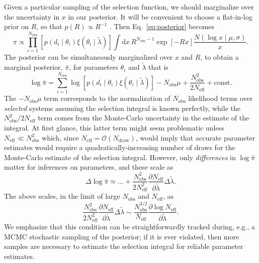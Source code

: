 \documentclass[modern]{aastex62}
\newcommand{\dd}{\mathrm{d}}
\newcommand{\Ndraw}{N_\mathrm{draw}}
\newcommand{\Neff}{N_\mathrm{eff}}
\newcommand{\Nobs}{N_\mathrm{obs}}
\begin{document}
Given a particular sampling of the selection function, we should marginalize
over the uncertainty in $x$ in our posterior.  It will be convenient to choose a
flat-in-log prior on $R$, so that $p(R) \propto R^{-1}$
\citep{Fishbach2018,Mandel2018}.  Then Eq.\ \eqref{eq:posterior} becomes
%
\begin{equation}
  \label{eq:posterior-integrated}
    \pi \propto \prod_{i = 1}^{\Nobs} \left[ p\left( d_i \mid \theta_i \right) \xi\left( \theta_i \mid \tilde{\lambda} \right) \right] \int \dd x \, R^{\Nobs - 1} \exp\left[ -R x \right] \frac{N\left( \log x \mid \mu, \sigma\right)}{x}.
\end{equation}
%
The posterior can be simultaneously marginalized over $x$ and $R$, to obtain a
marginal posterior, $\bar{\pi}$, for parameters $\theta_i$ and $\tilde{\lambda}$
that is
%
\begin{equation}
  \log \bar{\pi} = \sum_{i = 1}^{\Nobs} \log \left[ p\left( d_i \mid \theta_i \right) \xi\left( \theta_i \mid \tilde{\lambda} \right) \right] - \Nobs \mu + \frac{\Nobs^2}{2 \Neff} + \mathrm{const}.
\end{equation}
%
The $-\Nobs\mu$ term corresponds to the normalization of $\Nobs$ likelihood
terms over \emph{selected} systems \citep{Mandel2018} assuming the selection
integral is known perfectly, while the $\Nobs^2/2\Neff$ term comes from the
Monte-Carlo uncertainty in the estimate of the integral.  At first glance, this
latter term might seem problematic unless $\Neff \ll \Nobs^2$ which, since
$\Neff = \mathcal{O}\left( \Ndraw \right)$, would imply that accurate parameter
estimates would require a quadratically-increasing number of draws for the
Monte-Carlo estimate of the selection integral.  However, only
\emph{differences} in $\log \bar{\pi}$ matter for inferences on parameters, and
these scale as
%
\begin{equation}
    \Delta \log \bar{\pi} \simeq \ldots + \frac{\Nobs^2}{2\Neff^2} \frac{\partial \Neff}{\partial \tilde{\lambda}} \Delta \tilde{\lambda}.
\end{equation}
%
The above scales, in the limit of large $\Nobs$ and $\Neff$, as
%
\begin{equation}
    \frac{\Nobs^2}{2\Neff^2} \frac{\partial \Neff}{\partial \tilde{\lambda}} \Delta \tilde{\lambda} \sim \frac{\Nobs^{3/2}}{\Neff} \frac{\partial \log \Neff}{\partial \tilde{\lambda}}.
\end{equation}
%
We emphasize that this condition can be straightforwardly tracked during, e.g.,
a MCMC stochastic sampling of the posterior; if it is ever violated, then more
samples are necessary to estimate the selection integral for reliable parameter
estimates.
\end{document}

